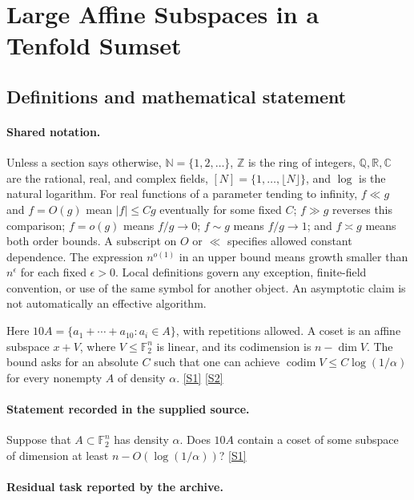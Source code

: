 \documentclass[11pt,a4paper]{article}
\newcommand{\N}{\mathbb{N}}
\newcommand{\Z}{\mathbb{Z}}
\newcommand{\Q}{\mathbb{Q}}
\newcommand{\R}{\mathbb{R}}
\newcommand{\C}{\mathbb{C}}
\newcommand{\F}{\mathbb{F}}
\newcommand{\sref}[2]{\hyperlink{source:#1:#2}{[S#2]}}
\begin{document}
\section{Large Affine Subspaces in a Tenfold Sumset}\label{statement}


\subsection{Definitions and mathematical statement}

\paragraph{Shared notation.}Unless a section says otherwise, $\N=\{1,2,\ldots\}$,
$\Z$ is the ring of integers, $\Q,\R,\C$ are the rational, real, and complex
fields, $[N]=\{1,\ldots,\lfloor N\rfloor\}$, and $\log$ is the natural
logarithm. For real functions of a parameter tending to infinity,
$f\ll g$ and $f=O(g)$ mean $|f|\leq Cg$ eventually for some fixed $C$;
$f\gg g$ reverses this comparison; $f=o(g)$ means $f/g\to0$;
$f\sim g$ means $f/g\to1$; and $f\asymp g$ means both order bounds.
A subscript on $O$ or $\ll$ specifies allowed constant dependence.
The expression $n^{o(1)}$ in an upper bound means growth smaller than
$n^\epsilon$ for each fixed $\epsilon>0$. Local definitions govern any
exception, finite-field convention, or use of the same symbol for another
object. An asymptotic claim is not automatically an effective algorithm.



Here $10A=\{a_1+\cdots+a_{10}:a_i\in A\}$, with repetitions allowed. A coset is an affine subspace $x+V$, where $V\leq\F_2^n$ is linear, and its codimension is $n-\dim V$. The bound asks for an absolute $C$ such that one can achieve $\operatorname{codim}V\leq C\log(1/\alpha)$ for every nonempty $A$ of density $\alpha$. \sref{statement}{1} \sref{statement}{2}

\paragraph{Statement recorded in the supplied source.}
Suppose that $A \subset \mathbb{F}_2^n$ has density $\alpha$. Does $10A$ contain a coset of some subspace of dimension at least $n - O(\log(1/\alpha))$? \sref{statement}{1}

\paragraph{Residual task reported by the archive.}
\end{document}
